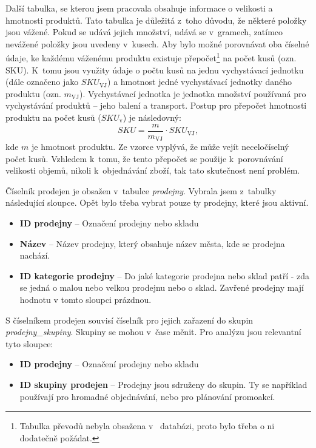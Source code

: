 Další tabulka, se kterou jsem pracovala obsahuje informace o velikosti a hmotnosti produktů. Tato tabulka je důležitá z~toho důvodu, že některé položky jsou vážené. Pokud se udává jejich množství, udává se v~gramech, zatímco nevážené položky jsou uvedeny v~kusech. Aby bylo možné porovnávat oba číselné údaje, ke každému váženému produktu existuje přepočet\footnote{Tabulka převodů nebyla obsažena v~ databázi, proto bylo   třeba o ni dodatečně požádat.} na počet kusů (ozn. SKU). K~tomu jsou využity údaje o počtu kusů na jednu vychystávací jednotku (dále označeno jako $SKU_{\mathrm{VJ}}$) a hmotnost jedné vychystávací jednotky daného produktu (ozn. $m_{\mathrm{VJ}}$). Vychystávací jednotka je jednotka množství používaná pro vychystávání produktů -- jeho balení a transport. Postup pro přepočet hmotnosti produktu na počet kusů ($SKU_{\mathrm{v}}$) je následovný: $$SKU = \frac{m}{m_{\mathrm{VJ}}} \cdot SKU_{\mathrm{VJ}},$$
kde $m$ je hmotnost produktu. Ze vzorce vyplývá, že může vejít neceločíselný počet kusů. Vzhledem k~tomu, že tento přepočet se použije k~porovnávání velikosti objemů, nikoli k~objednávání zboží, tak tato skutečnost není problém.



Číselník prodejen je obsažen v~tabulce \emph{prodejny}. Vybrala jsem z~tabulky následující sloupce. Opět bylo třeba vybrat pouze ty prodejny, které jsou aktivní.
\begin{itemize}
    \itemsep0em 
    \item \textbf{ID prodejny} -- Označení prodejny nebo skladu
    \item \textbf{Název} -- Název prodejny, který obsahuje název města, kde se prodejna nachází.
    \item \textbf{ID kategorie prodejny} -- Do jaké kategorie prodejna nebo sklad patří - zda se jedná o malou nebo velkou prodejnu nebo o sklad. Zavřené prodejny mají hodnotu v tomto sloupci prázdnou.
\end{itemize}

S číselníkem prodejen souvisí číselník pro jejich zařazení do skupin \emph{prodejny\_skupiny}. Skupiny se mohou v~čase měnit. Pro analýzu jsou relevantní tyto sloupce:
\begin{itemize}
    \itemsep0em 
    \item \textbf{ID prodejny} -- Označení prodejny nebo skladu
    \item \textbf{ID skupiny prodejen} -- Prodejny jsou sdruženy do skupin. Ty se například používají pro hromadné objednávání, nebo pro plánování promoakcí. 
\end{itemize}    

